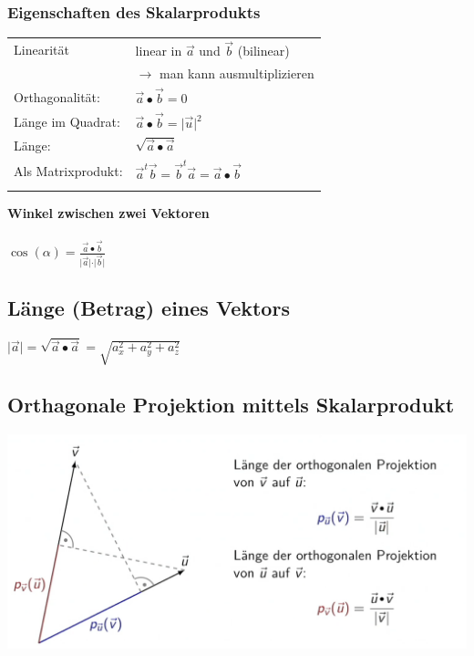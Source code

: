 			

			\subsubsection{Eigenschaften des Skalarprodukts}
			
			\begin{tabular}{ll}
			Linearität & linear in $\vec{a}$ und $\vec{b}$ (bilinear) \\
			& $\rightarrow$ man kann ausmultiplizieren\\
			
			Orthagonalität: &  $\vec{a} \bullet \vec{b} = 0$ \\
			
			Länge im Quadrat: & $\vec{a} \bullet \vec{b} = \vert \vec{u} \vert ^2$ 	\\
						
			Länge: &$\sqrt{\vec{a} \bullet \vec{a}}$ \\
			
			Als Matrixprodukt: & $\vec{a}^t \vec{b} = \vec{b}^t \vec{a} = \vec{a} \bullet \vec{b}$ \\
			\\
			\end{tabular}
			
			\textbf{Winkel zwischen zwei Vektoren} \\
			\\
			$\cos(\alpha) = \frac{\vec{a} \bullet \vec{b}}{ \vert \vec{a} \vert \cdot \vert \vec{b} \vert}$ \\
			
			
			 
		    \subsection{Länge (Betrag) eines Vektors}
		    $\vert \vec{a} \vert = \sqrt{\vec{a} \bullet \vec{a}} = \sqrt{a_x^2 + a_y^2 + a_z^2}$
		    
		    \vfill\null
		    \columnbreak
		    
		    
			
			\subsection{Orthagonale Projektion mittels Skalarprodukt}
			\includegraphics[width=0.65\linewidth]{Bilder/orthagonale-projektion}
			
